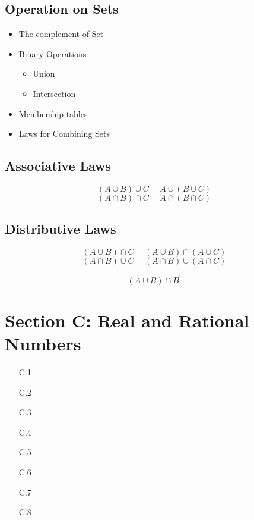 \subsection*{Operation on Sets}

\begin{itemize}
\item The complement of Set
\item Binary Operations
\begin{itemize}
\item Union
\item Intersection
\end{itemize}
\item Membership tables
\item Laws for Combining Sets
\end{itemize}

\newpage


\subsection*{Associative Laws}
\[ (A \cup B) \cup C =  A \cup (B \cup C)  \]
\[ (A \cap B) \cap C =  A \cap (B \cap C)  \]

\subsection*{Distributive Laws}
\[ (A \cup B) \cap C =  (A \cup B) \cap (A \cup C)  \]
\[ (A \cap B) \cup C =  (A \cap B) \cup (A \cap C)  \]


\[ (A \cup B) \cap B^{\prime} \]
\section*{Section C: Real and Rational Numbers}
\begin{itemize}
\item[C.1]
\item[C.2]
\item[C.3]
\item[C.4]
\item[C.5]
\item[C.6]
\item[C.7]
\item[C.8]
\end{itemize}
\newpage
\newpage
